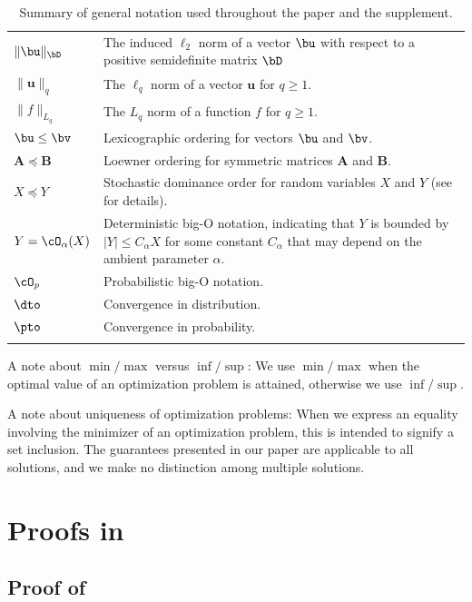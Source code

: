 \documentclass[11pt]{article}
\numberwithin{equation}{section}
\numberwithin{figure}{section}
\begin{document}
\begin{table}[ht]
\begin{tabularx}{\textwidth}{L{2.75cm}L{12.5cm}}
$\| \bu \|_{\bD}$ & The induced $\ell_2$ norm of a vector $\bu$ with respect to a positive semidefinite matrix $\bD$ \\
$\| \mathbf{u} \|_{q}$ & The $\ell_q$ norm of a vector $\mathbf{u}$ for $q \ge 1$. \\
$\| f \|_{L_q}$ & The $L_q$ norm of a function $f$ for $q \ge 1$. \\
\midrule
$\bu \le \bv$ & Lexicographic ordering for vectors $\bu$ and $\bv$. \\
$\bm{A} \preceq \bm{B}$ & Loewner ordering for symmetric matrices $\bm{A}$ and $\bm{B}$.\\
$X \preceq Y$ & Stochastic dominance order for random variables $X$ and $Y$ (see  for details). \\
\midrule
$Y = \cO_\alpha(X)$ & Deterministic big-O notation, indicating that $Y$ is bounded by $| Y | \le C_\alpha X$ for some constant $C_\alpha$ that may depend on the ambient parameter $\alpha$. \\
$\cO_p$ & Probabilistic big-O notation. \\
$\dto$ & Convergence in distribution. \\
$\pto$ & Convergence in probability. \\
\bottomrule
\end{tabularx}
\caption{Summary of general notation used throughout the paper and the supplement.}
\label{tab:notations}
\end{table}

A note about $\min/\max$ versus $\inf/\sup$:
We use $\min/\max$ when the optimal value of an optimization problem is attained, otherwise we use $\inf/\sup$.

A note about uniqueness of optimization problems: 
When we express an equality involving the minimizer of an optimization problem, this is intended to signify a set inclusion. 
The guarantees presented in our paper are applicable to all solutions, and we make no distinction among multiple solutions.

\clearpage
\section{Proofs in }
\label{app:sec:data_gen_test_def_inv_arg_proofs}

\subsection{Proof of } \label{proof:conf_set_coverage}
\end{document}
